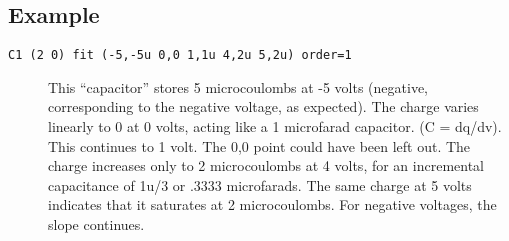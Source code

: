 \subsection{Example} 

\begin{description}
  
\item[{\tt C1 (2 0) fit (-5,-5u 0,0 1,1u 4,2u 5,2u) order=1}]
This ``capacitor'' stores 5 microcoulombs at -5 volts (negative,
corresponding to the negative voltage, as expected).  The charge
varies linearly to 0 at 0 volts, acting like a 1 microfarad capacitor.
(C = dq/dv).  This continues to 1 volt.  The 0,0 point could have been
left out.  The charge increases only to 2 microcoulombs at 4 volts,
for an incremental capacitance of 1u/3 or .3333 microfarads.  The same
charge at 5 volts indicates that it saturates at 2 microcoulombs.  For
negative voltages, the slope continues.

\end{description}
